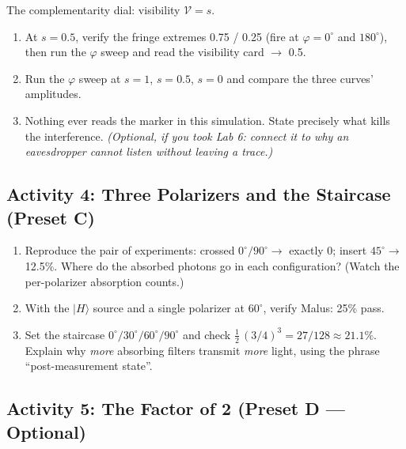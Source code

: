 \documentclass[a4paper,11pt]{article}
\providecommand{\ket}[1]{|#1\rangle}
\begin{document}
\begin{studentbox}
The complementarity dial: visibility $\mathcal{V} = s$.
\begin{enumerate}
    \item At $s = 0.5$, verify the fringe extremes 0.75 / 0.25 (fire at
          $\varphi = 0^\circ$ and $180^\circ$), then run the $\varphi$ sweep and read
          the visibility card $\rightarrow$ 0.5.
    \item Run the $\varphi$ sweep at $s = 1$, $s = 0.5$, $s = 0$ and compare the
          three curves' amplitudes.
    \item Nothing ever reads the marker in this simulation. State precisely what
          kills the interference. \emph{(Optional, if you took Lab 6: connect it to
          why an eavesdropper cannot listen without leaving a trace.)}
\end{enumerate}
\end{studentbox}

\subsection{Activity 4: Three Polarizers and the Staircase (Preset C)}

\begin{studentbox}
\begin{enumerate}
    \item Reproduce the pair of experiments: crossed $0^\circ/90^\circ \rightarrow$
          exactly 0; insert $45^\circ \rightarrow$ 12.5\%. Where do the absorbed
          photons go in each configuration? (Watch the per-polarizer absorption
          counts.)
    \item With the $\ket{H}$ source and a single polarizer at $60^\circ$, verify
          Malus: 25\% pass.
    \item Set the staircase $0^\circ/30^\circ/60^\circ/90^\circ$ and check
          $\tfrac12\,(3/4)^3 = 27/128 \approx 21.1\%$. Explain why \emph{more}
          absorbing filters transmit \emph{more} light, using the phrase
          ``post-measurement state''.
\end{enumerate}
\end{studentbox}

\subsection{Activity 5: The Factor of 2 (Preset D --- Optional)}
\end{document}
